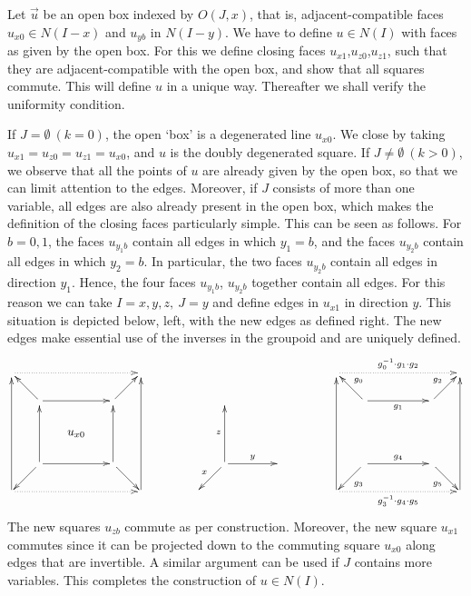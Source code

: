 \documentclass[10pt,a4paper]{article}
\begin{document}
Let $\vec u$ be an open box indexed by $O(J,x)$, that is,
adjacent-compatible faces $u_{x0}\in N(I-x)$ and $u_{yb}$ in $N(I-y)$.
We have to define $u\in N(I)$ with faces as given by the open box.
For this we define closing faces $u_{x1}$,$u_{z0}$,$u_{z1}$, such that they
are adjacent-compatible with the open box, and show that all squares
commute. This will define $u$ in a unique way.
Thereafter we shall verify the uniformity condition.

If $J=\emptyset~(k=0)$,  the open `box' is a degenerated line $u_{x0}$.
We close by taking $u_{x1}=u_{z0}=u_{z1}=u_{x0}$, and $u$ is the
doubly degenerated square. If $J\neq\emptyset~(k>0)$,
we observe that all the points of $u$ are already given by the open
box, so that we can limit attention to the edges.
Moreover, if $J$ consists of more than one variable, all edges are also
already present in the open box, which makes the definition of the closing faces
particularly simple. This can be seen as follows.
For $b=0,1$, the faces $u_{y_1b}$ contain all edges in which $y_1 = b$,
and the faces $u_{y_2b}$ contain all edges in which $y_2 = b$.
In particular, the two faces $u_{y_2b}$ contain all edges in direction $y_1$.
Hence, the four faces $u_{y_1b}$, $u_{y_2b}$ together contain all edges.
For this reason we can take $I=x,y,z,~J=y$ and define edges in $u_{x1}$ in direction $y$.
This situation is depicted below, left, with the new edges as defined right.
The new edges make essential use of the inverses in the groupoid
and are uniquely defined.
\[
\xymatrix@R=.6cm@C=.6cm{
\ar@{.>}[rrrr]            &&&&         &
&&&&&         &
\ar@{.>}[rrrr]^{g_0^{-1}\cdot g_1\cdot g_2}           &&&&         \\
&\ar[lu]\ar[rr]        &&  \ar[ru]&   &
&&&&&   &
&\ar[lu]_{g_0} \ar[rr]_{g_1}         &&  \ar[ru]^{g_2} &   \\
&&u_{x0}&&                               &
&&&&&                               &
&&~~~&&                               \\
&\ar[ld]\ar[rr]\ar[uu]&&\ar[rd]\ar[uu]& &
&&\ar[ld]_x\ar[rr]^{y}\ar[uu]^z&&& &
&\ar[ld]^{g_3}\ar[rr]^{g_4}&&\ar[rd]_{g_5} & \\
\ar[uuuu]\ar@{.>}[rrrr]&&&&\ar[uuuu] &
&&&&&  &
\ar[uuuu]\ar@{.>}[rrrr]_{g_3^{-1}\cdot g_4\cdot g_5}&&&&\ar[uuuu]\\
}
\]
The new squares $u_{zb}$ commute as per construction.
Moreover, the new square $u_{x1}$ commutes since it can
be projected down to the commuting square $u_{x0}$
along edges that are invertible.
A similar argument can be used if $J$ contains more variables.
This completes the construction of $u\in N(I)$.
\end{document}
